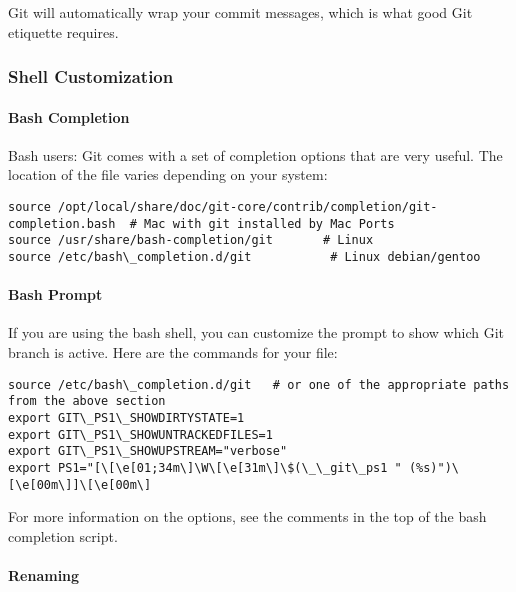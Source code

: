 Git will automatically wrap your commit messages, which is what good Git
etiquette requires.


\subsubsection{Shell Customization}
\label{subsubsec:ShellCustomization}

\paragraph{Bash Completion}
\label{par:BashCompletion}

Bash users: Git comes with a set of completion options that are very useful. The
location of the file varies depending on your system:

\begin{verbatim}
source /opt/local/share/doc/git-core/contrib/completion/git-completion.bash  # Mac with git installed by Mac Ports
source /usr/share/bash-completion/git       # Linux
source /etc/bash\_completion.d/git           # Linux debian/gentoo
\end{verbatim}


\paragraph{Bash Prompt}
\label{par:BashPrompt}

If you are using the bash shell, you can customize the prompt to show which Git
branch is active. Here are the commands for your  file:

\begin{verbatim}
source /etc/bash\_completion.d/git   # or one of the appropriate paths from the above section
export GIT\_PS1\_SHOWDIRTYSTATE=1
export GIT\_PS1\_SHOWUNTRACKEDFILES=1
export GIT\_PS1\_SHOWUPSTREAM="verbose"
export PS1="[\[\e[01;34m\]\W\[\e[31m\]\$(\_\_git\_ps1 " (%s)")\[\e[00m\]]\[\e[00m\]
\end{verbatim}

For more information on the options, see the comments in the top of the bash
completion script.

\paragraph{Renaming}
\label{par:Renaming}

